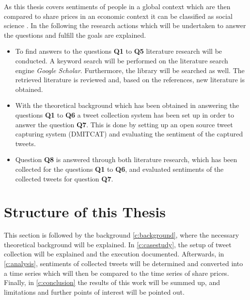 As this thesis covers sentiments of people in a global context which are then compared to share prices in an economic context it can be classified as social science \citep{Recker2013}.
In the following the research actions which will be undertaken to answer the questions and fulfill the goals are explained.

\begin{itemize}
	\item To find answers to the questions \textbf{Q1} to \textbf{Q5} literature research will be conducted.
	A keyword search will be performed on the literature search engine \emph{Google Scholar}.
	Furthermore, the library will be searched as well.
	The retrieved literature is reviewed and, based on the references, new literature is obtained.
	
	\item With the theoretical background which has been obtained in answering the questions \textbf{Q1} to \textbf{Q6} a tweet collection system has been set up in order to answer the question \textbf{Q7}.
	This is done by setting up an open source tweet capturing system (\ac{DMITCAT}) and evaluating the sentiment of the captured tweets.
	
	\item Question \textbf{Q8} is answered through both literature research, which has been collected for the questions \textbf{Q1} to \textbf{Q6}, and evaluated sentiments of the collected tweets for question \textbf{Q7}.
\end{itemize}

\section{Structure of this Thesis}
\label{s:introduction-structureofthisthesis}

This section is followed by the background \cref{c:background}, where the necessary theoretical background will be explained. 
In \cref{c:casestudy}, the setup of tweet collection will be explained and the execution documented.
Afterwards, in \cref{c:analysis}, sentiments of collected tweets will be determined and converted into a time series which will then be compared to the time series of share prices.
Finally, in \cref{c:conclusion} the results of this work will be summed up, and limitations and further points of interest will be pointed out.
